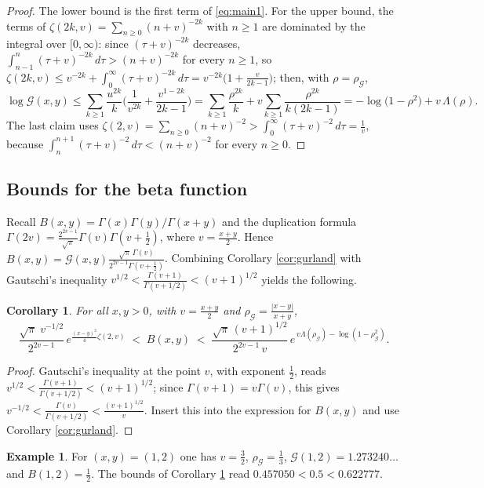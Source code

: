 \documentclass[11pt,a4paper]{amsart}
\newtheorem{corollary}[theorem]{Corollary}
\theoremstyle{definition}
\newtheorem{example}[theorem]{Example}
\newcommand{\Gg}{\mathcal{G}}
\begin{document}
\begin{proof}
The lower bound is the first term of \eqref{eq:main1}. For the upper bound, the
terms of $\zeta(2k,v)=\sum_{n\ge0}(n+v)^{-2k}$ with $n\ge1$ are dominated by the
integral over $[0,\infty)$: since $(\tau+v)^{-2k}$ decreases,
$\int_{n-1}^{n}(\tau+v)^{-2k}\,d\tau>(n+v)^{-2k}$ for every $n\ge1$, so
$\zeta(2k,v)\le v^{-2k}+\int_{0}^{\infty}(\tau+v)^{-2k}\,d\tau
=v^{-2k}\big(1+\frac{v}{2k-1}\big)$; then, with $\rho=\rho_{\Gg}$,
\[
  \log\Gg(x,y)\le\sum_{k\ge1}\frac{u^{2k}}{k}\Big(\frac{1}{v^{2k}}
   +\frac{v^{1-2k}}{2k-1}\Big)
  =\sum_{k\ge1}\frac{\rho^{2k}}{k}+v\sum_{k\ge1}\frac{\rho^{2k}}{k(2k-1)}
  =-\log\big(1-\rho^{2}\big)+v\,\Lambda(\rho).
\]
The last claim uses
$\zeta(2,v)=\sum_{n\ge0}(n+v)^{-2}>\int_{0}^{\infty}(\tau+v)^{-2}\,d\tau=\frac1v$,
because $\int_{n}^{n+1}(\tau+v)^{-2}\,d\tau<(n+v)^{-2}$ for every $n\ge0$.
\end{proof}

\subsection{Bounds for the beta function}
Recall $B(x,y)=\Gamma(x)\Gamma(y)/\Gamma(x+y)$ and the duplication formula
$\Gamma(2v)=\frac{2^{2v-1}}{\sqrt\pi}\Gamma(v)\Gamma(v+\frac12)$, where $v=\frac{x+y}{2}$.
Hence $B(x,y)=\Gg(x,y)\frac{\sqrt\pi\,\Gamma(v)}{2^{2v-1}\Gamma(v+\frac12)}$. Combining
Corollary \ref{cor:gurland} with Gautschi's inequality
$v^{1/2}<\frac{\Gamma(v+1)}{\Gamma(v+1/2)}<(v+1)^{1/2}$ \cite{Gautschi74} yields the
following.

\begin{corollary}\label{cor:beta}
For all $x,y>0$, with $v=\frac{x+y}{2}$ and $\rho_{\Gg}=\frac{|x-y|}{x+y}$,
\[
  \frac{\sqrt\pi\;v^{-1/2}}{2^{2v-1}}\,
   e^{\frac{(x-y)^{2}}{4}\zeta(2,v)}
  \;<\;B(x,y)\;<\;
  \frac{\sqrt\pi\,(v+1)^{1/2}}{2^{2v-1}\,v}\,
   e^{\,v\Lambda(\rho_{\Gg})-\log(1-\rho_{\Gg}^{2})}.
\]
\end{corollary}

\begin{proof}
Gautschi's inequality at the point $v$, with exponent $\frac12$, reads
$v^{1/2}<\frac{\Gamma(v+1)}{\Gamma(v+1/2)}<(v+1)^{1/2}$; since $\Gamma(v+1)=v\Gamma(v)$,
this gives $v^{-1/2}<\frac{\Gamma(v)}{\Gamma(v+1/2)}<\frac{(v+1)^{1/2}}{v}$. Insert this
into the expression for $B(x,y)$ and use Corollary \ref{cor:gurland}.
\end{proof}

\begin{example}
For $(x,y)=(1,2)$ one has $v=\frac32$, $\rho_{\Gg}=\frac13$, $\Gg(1,2)=1.273240\ldots$
and $B(1,2)=\frac12$. The bounds of Corollary \ref{cor:beta} read
$0.457050<0.5<0.622777$.
\end{example}
\end{document}
